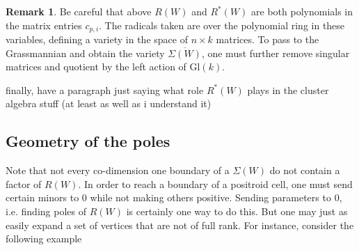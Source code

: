 \documentclass[11pt]{article}
\newtheorem{thm}{Theorem}[section]
\theoremstyle{remark}
\theoremstyle{definition}
\newtheorem{rmk}[thm]{Remark}
\begin{document}
\begin{rmk}
Be careful that above $R(W)$ and $R^{\ast}(W)$ are both polynomials in the matrix entries $c_{p,i}$. The radicals taken are over the polynomial ring in these variables, defining a variety in the space of $n \times k$ matrices. To pass to the Grassmannian and obtain the variety $\overline{\Sigma(W)}$, one must further remove singular matrices and quotient by the left action of $\mathrm{Gl}(k)$. 
\end{rmk}

{\color{red} finally, have a paragraph just saying what role $R^{\ast}(W)$ plays in the cluster algebra stuff (at least as well as i understand it)}


\subsection{Geometry of the poles}

Note that not every co-dimension one boundary of a $\Sigma(W)$ do not contain a factor of $R(W)$. In order to reach a boundary of a positroid cell, one must send certain minors to 0 while not making others positive. Sending parameters to $0$, i.e. finding poles of $R(W)$ is certainly one way to do this. But one may just as easily expand a set of vertices that are not of full rank. For instance, consider the following example  
\end{document}
